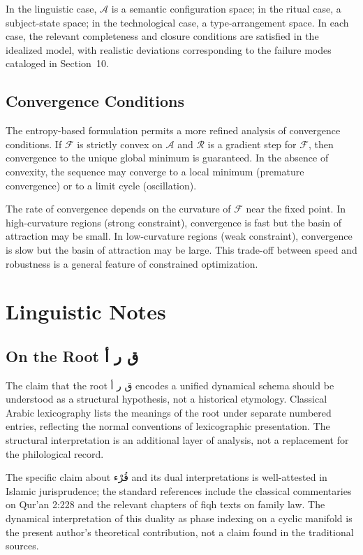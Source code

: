 \documentclass[12pt, oneside]{article}
\newcommand{\AR}[1]{\textarabic{#1}}
\theoremstyle{definition}
\theoremstyle{remark}
\begin{document}
In the linguistic case, $\mathcal{A}$ is a semantic configuration space; in the ritual case, a subject-state space; in the technological case, a type-arrangement space.
In each case, the relevant completeness and closure conditions are satisfied in the idealized model, with realistic deviations corresponding to the failure modes cataloged in Section~10.

\subsection{Convergence Conditions}

The entropy-based formulation permits a more refined analysis of convergence conditions.
If $\mathcal{F}$ is strictly convex on $\mathcal{A}$ and $\mathcal{R}$ is a gradient step for $\mathcal{F}$, then convergence to the unique global minimum is guaranteed.
In the absence of convexity, the sequence may converge to a local minimum (premature convergence) or to a limit cycle (oscillation).

The rate of convergence depends on the curvature of $\mathcal{F}$ near the fixed point.
In high-curvature regions (strong constraint), convergence is fast but the basin of attraction may be small.
In low-curvature regions (weak constraint), convergence is slow but the basin of attraction may be large.
This trade-off between speed and robustness is a general feature of constrained optimization.

\section{Linguistic Notes}

\subsection{On the Root \AR{ق ر أ}}

The claim that the root \AR{ق ر أ} encodes a unified dynamical schema should be understood as a structural hypothesis, not a historical etymology.
Classical Arabic lexicography lists the meanings of the root under separate numbered entries, reflecting the normal conventions of lexicographic presentation.
The structural interpretation is an additional layer of analysis, not a replacement for the philological record.

The specific claim about \AR{قُرْء} and its dual interpretations is well-attested in Islamic jurisprudence; the standard references include the classical commentaries on Qur'an 2:228 and the relevant chapters of fiqh texts on family law.
The dynamical interpretation of this duality as phase indexing on a cyclic manifold is the present author's theoretical contribution, not a claim found in the traditional sources.
\end{document}
